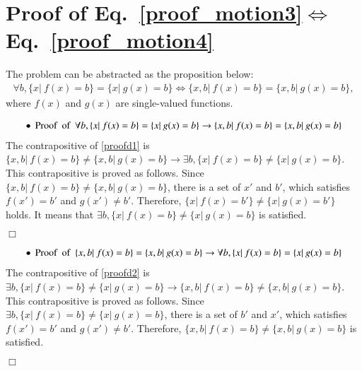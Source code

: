 \documentclass[preprint,
bibnotes,
 amsmath,amssymb,
 aps,
]{revtex4-1}
\begin{document}
\section{Proof of Eq.~\eqref{proof_motion3}$\Leftrightarrow$Eq.~\eqref{proof_motion4}}
\label{appendix2}
The problem can be abstracted as the proposition below: 
\begin{eqnarray}
\forall b, \{x | \:f(x) = b\} = \{x | \:g(x) = b\}\Leftrightarrow \{x,b | \:f(x) = b\} = \{x,b | \:g(x) = b\},
\end{eqnarray}
where $f(x)$ and $g(x)$ are single-valued functions.\par
\begin{eqnarray}
\label{proofd1}
\bullet\:\:{\rm Proof\:\:of\:\:} \forall b, \{x | \:f(x) = b\} = \{x | \:g(x) = b\}\rightarrow \{x,b | \:f(x) = b\} = \{x,b | \:g(x) = b\}
\end{eqnarray}
The contrapositive of \eqref{proofd1} is $\{x,b | \:f(x) = b\} \neq \{x,b | \:g(x) = b\} \rightarrow \exists b, \{x | \:f(x) = b\} \neq \{x | \:g(x) = b\}$. This contrapositive is proved as follows. Since $\{x,b | \:f(x) = b\} \neq \{x,b | \:g(x) = b\}$, there is a set of $x'$ and $b'$, which satisfies $f(x')=b'$ and $g(x')\neq b'$. Therefore, $\{x | \:f(x) = b'\} \neq \{x | \:g(x) = b'\}$ holds. It means that $\exists b, \{x | \:f(x) = b\} \neq \{x | \:g(x) = b\}$ is satisfied.\par
\begin{flushright}
$\Box$
\end{flushright}\par
\begin{eqnarray}
\label{proofd2}
\bullet\:\:{\rm Proof\:\:of\:\:} \{x,b | \:f(x) = b\} = \{x,b | \:g(x) = b\} \rightarrow \forall b, \{x | \:f(x) = b\} = \{x | \:g(x) = b\}
\end{eqnarray}
The contrapositive of \eqref{proofd2} is $\exists b, \{x | \:f(x) = b\} \neq \{x | \:g(x) = b\} \rightarrow \{x,b | \:f(x) = b\} \neq \{x,b | \:g(x) = b\}$. This contrapositive is proved as follows. Since $\exists b, \{x | \:f(x) = b\} \neq \{x | \:g(x) = b\}$, there is a set of $b'$ and $x'$, which satisfies $f(x')=b'$ and $g(x')\neq b'$. Therefore, $\{x,b | \:f(x) = b\} \neq \{x,b | \:g(x) = b\}$ is satisfied.\par
\begin{flushright}
$\Box$
\end{flushright}\par
\end{document}
